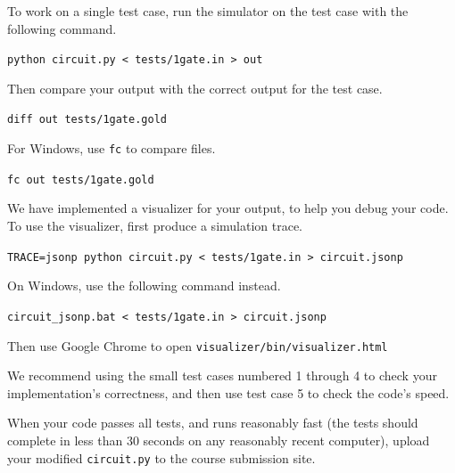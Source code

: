\documentclass[12pt,twoside]{article}
\begin{document}
\begin{problems}
\begin{problemparts}
To work on a single test case, run the simulator on the test case with the
following command.

\texttt{python circuit.py < tests/1gate.in > out}

Then compare your output with the correct output for the test case.

\texttt{diff out tests/1gate.gold}

For Windows, use \texttt{fc} to compare files.

\texttt{fc out tests/1gate.gold}

We have implemented a visualizer for your output, to help you debug your code.
To use the visualizer, first produce a simulation trace.

\texttt{TRACE=jsonp python circuit.py < tests/1gate.in > circuit.jsonp}

On Windows, use the following command instead.

\texttt{circuit\_jsonp.bat < tests/1gate.in > circuit.jsonp}

Then use Google Chrome to open
\texttt{visualizer/bin/visualizer.html}

We recommend using the small test cases numbered 1 through 4 to check your
implementation's correctness, and then use test case 5 to check the code's
speed.

When your code passes all tests, and runs reasonably fast (the tests should
complete in less than 30 seconds on any reasonably recent computer), upload your
modified \texttt{circuit.py} to the course submission site.



\end{problemparts}

\end{problems}
\end{document}
